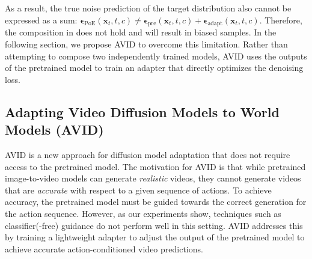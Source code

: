 As a result, the true noise prediction of the target distribution also cannot be expressed as a sum: $\mathbf{\epsilon}_{\text{PoE}} (\mathbf{x}_t, t, c) \neq
\mathbf{\epsilon}_{\text{pre}} (\mathbf{x}_t, t, c) + \mathbf{\epsilon}_{\text{adapt}} (\mathbf{x}_t, t, c)$. Therefore, the composition in   does not hold and  will result in biased samples. 
%
In the following section, we propose AVID to overcome this limitation.
%
Rather than attempting to compose two independently trained models, AVID uses the outputs of the pretrained model to train an adapter that directly optimizes the denoising loss.
% 

\subsection{Adapting Video Diffusion Models to World Models (AVID)}
\label{sec:avid}
AVID is a new approach for diffusion model adaptation that does not require access to the pretrained model.  The motivation for AVID is that while pretrained image-to-video models can generate \textit{realistic} videos, they cannot generate videos that are \textit{accurate} with respect to a given sequence of actions. To achieve accuracy, the pretrained model must be guided towards the correct generation for the action sequence. However, as our experiments show, techniques such as classifier(-free) guidance do not perform well in this setting. AVID addresses this by training a lightweight adapter to adjust the output of the pretrained model to achieve accurate action-conditioned video predictions.




